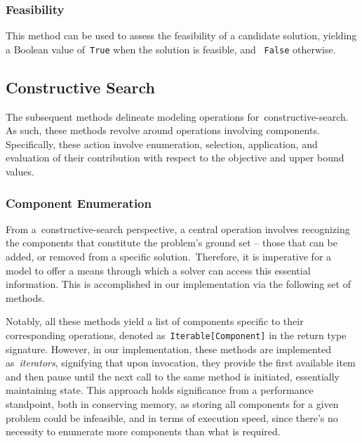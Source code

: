 \subsubsection*{Feasibility}

\begin{center}
\end{center}

This method can be used to assess the feasibility of a candidate solution,
yielding a Boolean value of~\texttt{True} when the solution is feasible, and
~\texttt{False} otherwise.

\subsection{Constructive Search}

The subsequent methods delineate modeling operations
for~\acrshort{constructive-search}. As such, these methods revolve around
operations involving components. Specifically, these action involve enumeration,
selection, application, and evaluation of their contribution with respect to the
objective and upper bound values.

\subsubsection*{Component Enumeration}

From a~\acrshort{constructive-search} perspective, a central operation involves
recognizing the components that constitute the problem's ground set -- those
that can be added, or removed from a specific solution.~Therefore, it is
imperative for a model to offer a means through which a solver can access this
essential information. This is accomplished in our implementation via the
following set of methods.

\begin{center}

\end{center}

Notably, all these methods yield a list of components specific to their
corresponding operations, denoted as~\texttt{Iterable[Component]} in the return
type signature. However, in our implementation, these methods are implemented
as~\emph{iterators}, signifying that upon invocation, they provide the first
available item and then pause until the next call to the same method is
initiated, essentially maintaining state. This approach holds significance from
a performance standpoint, both in conserving memory, as storing all components
for a given problem could be infeasible, and in terms of execution speed, since
there's no necessity to enumerate more components than what is required.


